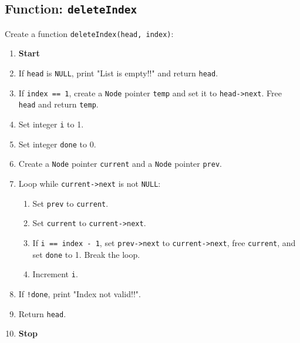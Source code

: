 {  \subsection{Function: \texttt{deleteIndex}}
  Create a function \texttt{deleteIndex(head, index)}:
  \begin{enumerate}[label=\arabic*:,left=0pt]
    \item \textbf{Start}
    \item If \texttt{head} is \texttt{NULL}, print "List is empty!!" and return \texttt{head}.
    \item If \texttt{index == 1}, create a \texttt{Node} pointer \texttt{temp} and set it to \texttt{head->next}. Free \texttt{head} and return \texttt{temp}.
    \item Set integer \texttt{i} to 1.
    \item Set integer \texttt{done} to 0.
    \item Create a \texttt{Node} pointer \texttt{current} and a \texttt{Node} pointer \texttt{prev}.
    \item Loop while \texttt{current->next} is not \texttt{NULL}:
          \begin{enumerate}[label=2.\arabic*:, start=1]
            \item Set \texttt{prev} to \texttt{current}.
            \item Set \texttt{current} to \texttt{current->next}.
            \item If \texttt{i == index - 1}, set \texttt{prev->next} to \texttt{current->next}, free \texttt{current}, and set \texttt{done} to 1. Break the loop.
            \item Increment \texttt{i}.
          \end{enumerate}
    \item If \texttt{!done}, print "Index not valid!!".
    \item Return \texttt{head}.
    \item \textbf{Stop}
  \end{enumerate}

}
